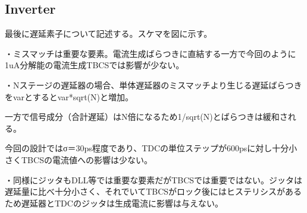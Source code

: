 \documentclass[letterpaper, 10 pt, conference]{ieeeconf}  %
\begin{document}
\subsection{Inverter}
最後に遅延素子について記述する。スケマを図に示す。

・ミスマッチは重要な要素。電流生成ばらつきに直結する一方で今回のように1uA分解能の電流生成TBCSでは影響が少ない。

・Nステージの遅延器の場合、単体遅延器のミスマッチより生じる遅延ばらつきをvarとするとvar*sqrt(N)と増加。

一方で信号成分（合計遅延）はN倍になるため1/sqrt(N)とばらつきは緩和される。

今回の設計ではσ＝30ps程度であり、TDCの単位ステップが600psに対し十分小さくTBCSの電流値への影響は少ない。

・同様にジッタもDLL等では重要な要素だがTBCSでは重要ではない。ジッタは遅延量に比べ十分小さく、それでいてTBCSがロック後にはヒステリシスがあるため遅延器とTDCのジッタは生成電流に影響は与えない。
\end{document}
